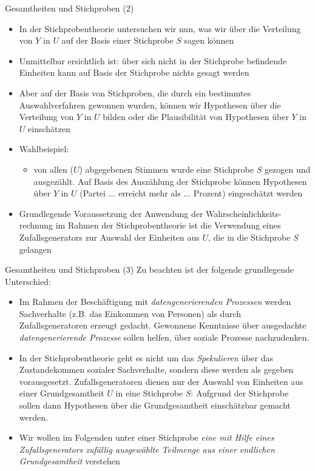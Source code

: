 \documentclass[9pt]{beamer}
\begin{document}
\begin{frame}{Gesamtheiten und Stichproben (2)}
\begin{itemize}
\item In der Stichprobentheorie untersuchen wir nun, was wir \"{u}ber die Verteilung von $Y$ in $U$ auf der Basis einer Stichprobe $S$ sagen k\"{o}nnen
\item Unmittelbar ersichtlich ist: \"{u}ber sich nicht in der Stichprobe befindende Einheiten kann auf Basis der Stichprobe nichts gesagt werden
\item Aber auf der Basis von Stichproben, die durch ein bestimmtes Auswahlverfahren gewonnen wurden, k\"{o}nnen wir Hypothesen \"{u}ber die Verteilung von $Y$ in $U$ bilden oder die Plausibilit\"{a}t von Hypothesen \"{u}ber $Y$ in $U$ einsch\"{a}tzen
\item Wahlbeispiel:
\begin{itemize}
  \item von allen ($U$) abgegebenen Stimmen wurde eine Stichprobe $S$ gezogen und ausgez\"{a}hlt. Auf Basis des Ausz\"{a}hlung der Stichprobe k\"{o}nnen Hypothesen \"{u}ber $Y$ in $U$ (Partei ... erreicht mehr als ... Prozent) eingesch\"{a}tzt werden
\end{itemize}
\item Grundlegende Voraussetzung der Anwendung der Wahrscheinlichkeits- rechnung im Rahmen der Stichprobentheorie ist die Verwendung eines Zufallsgenerators zur Auswahl der Einheiten aus $U$, die in die Stichprobe $S$ gelangen
\end{itemize}
\end{frame}

\begin{frame}{Gesamtheiten und Stichproben (3)}
Zu beachten ist der folgende grundlegende Unterschied:
\begin{itemize}
\item Im Rahmen der Besch\"{a}ftigung mit \emph{datengenerierenden Prozessen} werden Sachverhalte (z.B. das Einkommen von Personen) als durch Zufallsgeneratoren erzeugt gedacht. Gewonnene Kenntnisse \"{u}ber ausgedachte \emph{datengenerierende Prozesse} sollen helfen, \"{u}ber soziale Prozesse nachzudenken.
\item In der Stichprobentheorie geht es nicht um das \emph{Spekulieren} \"{u}ber das Zustandekommen sozialer Sachverhalte, sondern diese werden als gegeben vorausgesetzt. Zufallsgeneratoren dienen nur der Auswahl von Einheiten aus einer Grundgesamtheit $U$ in eine Stichprobe $S$: Aufgrund der Stichprobe sollen dann Hypothesen \"{u}ber die Grundgesamtheit einsch\"{a}tzbar gemacht werden.
\item Wir wollen im Folgenden unter einer Stichprobe \emph{eine mit Hilfe eines Zufallsgenerators zuf\"{a}llig ausgew\"{a}hlte Teilmenge aus einer endlichen Grundgesamtheit} verstehen
\end{itemize}
\end{frame}
\end{document}
